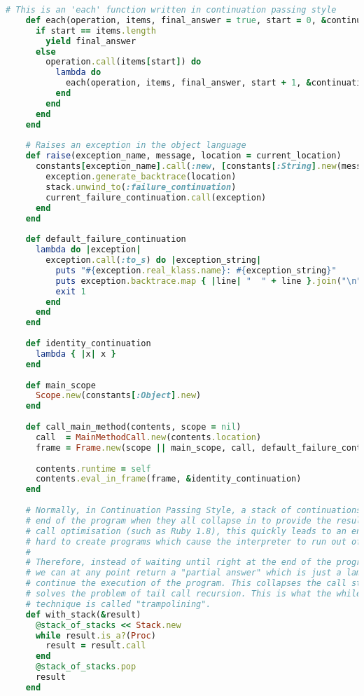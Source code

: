 \begin{lstlisting}[title={\small\ttfamily\bfseries runtime/runtime.rb},language=Ruby]
    # This is an 'each' function written in continuation passing style
    def each(operation, items, final_answer = true, start = 0, &continuation)
      if start == items.length
        yield final_answer
      else
        operation.call(items[start]) do
          lambda do
            each(operation, items, final_answer, start + 1, &continuation)
          end
        end
      end
    end
    
    # Raises an exception in the object language
    def raise(exception_name, message, location = current_location)
      constants[exception_name].call(:new, [constants[:String].new(message)]) do |exception|
        exception.generate_backtrace(location)
        stack.unwind_to(:failure_continuation)
        current_failure_continuation.call(exception)
      end
    end
    
    def default_failure_continuation
      lambda do |exception|
        exception.call(:to_s) do |exception_string|
          puts "#{exception.real_klass.name}: #{exception_string}"
          puts exception.backtrace.map { |line| "  " + line }.join("\n")
          exit 1
        end
      end
    end
    
    def identity_continuation
      lambda { |x| x }
    end
    
    def main_scope
      Scope.new(constants[:Object].new)
    end
    
    def call_main_method(contents, scope = nil)
      call  = MainMethodCall.new(contents.location)
      frame = Frame.new(scope || main_scope, call, default_failure_continuation)
      
      contents.runtime = self
      contents.eval_in_frame(frame, &identity_continuation)
    end
    
    # Normally, in Continuation Passing Style, a stack of continuations is built up right until the
    # end of the program when they all collapse in to provide the result. In languages without tail
    # call optimisation (such as Ruby 1.8), this quickly leads to an enormous stack, and it's not
    # hard to create programs which cause the interpreter to run out of stack space.
    # 
    # Therefore, instead of waiting until right at the end of the program to return the answer,
    # we can at any point return a "partial answer" which is just a lambda which can be called to
    # continue the execution of the program. This collapses the call stack right back down, so
    # solves the problem of tail call recursion. This is what the while loop is doing. This
    # technique is called "trampolining".
    def with_stack(&result)
      @stack_of_stacks << Stack.new
      while result.is_a?(Proc)
        result = result.call
      end
      @stack_of_stacks.pop
      result
    end
    

\end{lstlisting}
